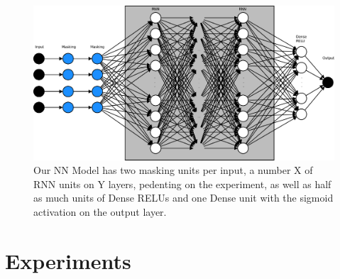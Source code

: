 \documentclass[
	ngerman,
	ruledheaders=section,%
	class=report,%
	thesis={type=bachelor},%
	accentcolor=9c,%
	custommargins=true,%
	marginpar=false,%
	parskip=half-,%
	fontsize=11pt,%
]{tudapub}
\begin{document}
\begin{figure}
    \includegraphics[width=\textwidth]{Model.pdf}
    \caption{Our NN Model has two masking units per input, a number X of RNN units on Y layers, pedenting on the experiment, as well as half as much units of Dense RELUs and one Dense unit with the sigmoid activation on the output layer.}
    \label{fig:Model}
\end{figure}





\chapter{Experiments}
\label{sec:experiments}
\end{document}
